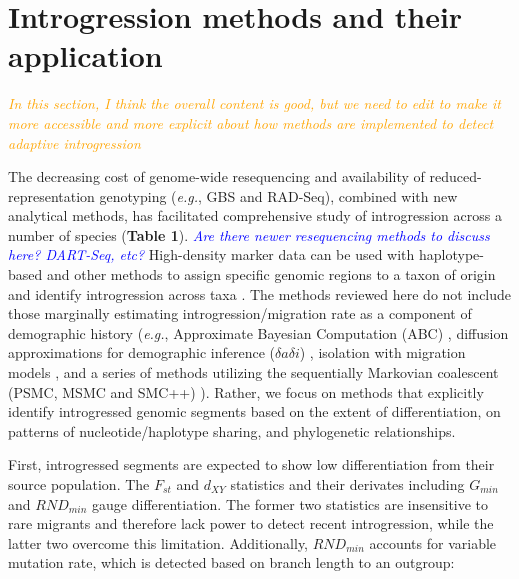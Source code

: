 \documentclass[11pt]{article}
\newcommand{\mbh}[1]{\textcolor{orange}{ \emph{\scriptsize  #1}} } %
\newcommand{\gmj}[1]{\textcolor{blue}{ \emph{\scriptsize  #1}} } %
\begin{document}
\section*{Introgression methods and their application}

\mbh{In this section, I think the overall content is good, but we need to edit to make it more accessible and more explicit about how methods are implemented to detect adaptive introgression}

The decreasing cost of genome-wide resequencing and availability of reduced-representation genotyping (\emph{e.g.}, GBS and RAD-Seq), combined with new analytical methods, has facilitated comprehensive study of introgression across a number of species (\textbf{Table 1}). \gmj{Are there newer resequencing methods to discuss here?  DART-Seq, etc?}
High-density marker data can be used with haplotype-based and other methods to assign specific genomic regions to a taxon of origin and identify introgression across taxa \cite{Martin2015,Price2009,Lawson2012,pease2015,rosenzweig2016,geneva2015}.
The methods reviewed here do not include those marginally estimating introgression\slash migration rate as a component of demographic history (\emph{e.g.}, Approximate Bayesian Computation (ABC) \cite{beaumont2002}, diffusion approximations for demographic inference ($\delta a\delta i$) \cite{gutenkunst2009}, isolation with migration models \cite{hey2004}, and a series of methods utilizing the sequentially Markovian coalescent (PSMC, MSMC and SMC++) \cite{li2011, schiffels2014, terhorst2017}). 
Rather, we focus on methods that explicitly identify introgressed genomic segments based on the extent of differentiation, on patterns of nucleotide/haplotype sharing, and phylogenetic relationships.

First, introgressed segments are expected to show low differentiation from their source population.
The $F_{st}$ and $d_{XY}$ statistics and their derivates including $G_{min}$ \cite{geneva2015} and $RND_{min}$\cite{rosenzweig2016} gauge differentiation. 
The former two statistics are insensitive to rare migrants and therefore lack power to detect recent introgression, while the latter two overcome this limitation.
Additionally, $RND_{min}$ accounts for variable mutation rate, which is detected based on branch length to an outgroup: 

 
\end{document}
